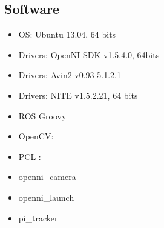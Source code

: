 	\subsection{Software}
		\begin{itemize}
			\item{OS: Ubuntu 13.04, 64 bits}
			\item{Drivers: OpenNI SDK v1.5.4.0, 64bits}
			\item{Drivers: Avin2-v0.93-5.1.2.1}
			\item{Drivers: NITE v1.5.2.21, 64 bits}
			\item{ROS Groovy}
			\item{OpenCV: }
			\item{PCL : }
			\item{openni\_camera}
			\item{openni\_launch}
			\item{pi\_tracker}


		\end{itemize}